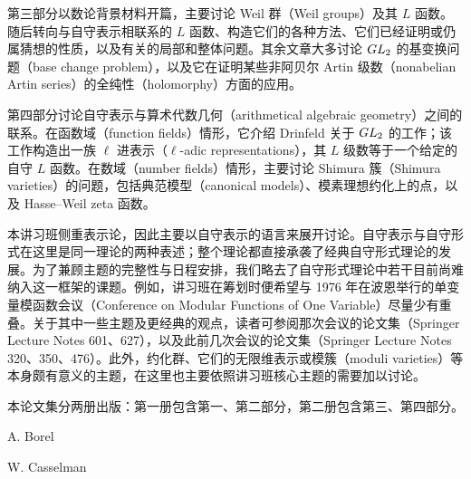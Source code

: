 第三部分以数论背景材料开篇，主要讨论 Weil 群（Weil groups）及其 $L$ 函数。随后转向与自守表示相联系的 $L$ 函数、构造它们的各种方法、它们已经证明或仍属猜想的性质，以及有关的局部和整体问题。其余文章大多讨论 $GL_2$ 的基变换问题（base change problem），以及它在证明某些非阿贝尔 Artin 级数（nonabelian Artin series）的全纯性（holomorphy）方面的应用。

第四部分讨论自守表示与算术代数几何（arithmetical algebraic geometry）之间的联系。在函数域（function fields）情形，它介绍 Drinfeld 关于 $GL_2$ 的工作；该工作构造出一族 $\ell$ 进表示（$\ell$-adic representations），其 $L$ 级数等于一个给定的自守 $L$ 函数。在数域（number fields）情形，主要讨论 Shimura 簇（Shimura varieties）的问题，包括典范模型（canonical models）、模素理想约化上的点，以及 Hasse--Weil zeta 函数。

本讲习班侧重表示论，因此主要以自守表示的语言来展开讨论。自守表示与自守形式在这里是同一理论的两种表述；整个理论都直接承袭了经典自守形式理论的发展。为了兼顾主题的完整性与日程安排，我们略去了自守形式理论中若干目前尚难纳入这一框架的课题。例如，讲习班在筹划时便希望与 1976 年在波恩举行的单变量模函数会议（Conference on Modular Functions of One Variable）尽量少有重叠。关于其中一些主题及更经典的观点，读者可参阅那次会议的论文集（Springer Lecture Notes 601、627），以及此前几次会议的论文集（Springer Lecture Notes 320、350、476）。此外，约化群、它们的无限维表示或模簇（moduli varieties）等本身颇有意义的主题，在这里也主要依照讲习班核心主题的需要加以讨论。

本论文集分两册出版：第一册包含第一、第二部分，第二册包含第三、第四部分。
\begin{flushright}A. Borel\par W. Casselman\end{flushright}
